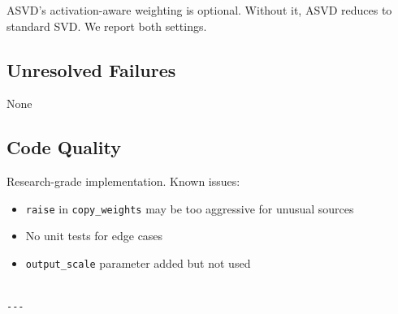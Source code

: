 ASVD's activation-aware weighting is optional. Without it, ASVD reduces 
to standard SVD. We report both settings.

\subsection{Unresolved Failures}

None

\subsection{Code Quality}

Research-grade implementation. Known issues:
\begin{itemize}
\item \texttt{raise} in \texttt{copy\_weights} may be too aggressive for unusual sources
\item No unit tests for edge cases
\item \texttt{output\_scale} parameter added but not used
\end{itemize}
\begin{lstlisting}

---
\end{lstlisting}